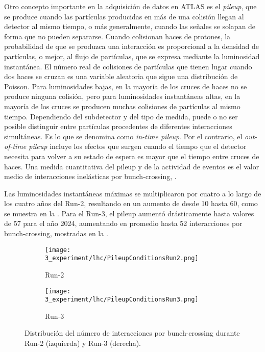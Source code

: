 Otro concepto importante en la adquisición de datos en \ac{ATLAS} es el \textit{pileup}, que se produce cuando las partículas producidas en más de una colisión \pp llegan al detector al mismo tiempo, o más generalmente, cuando las señales se solapan de forma que no pueden separarse. Cuando colisionan haces de protones, la probabilidad de que se produzca una interacción es proporcional a la densidad de partículas, o mejor, al flujo de partículas, que se expresa mediante la luminosidad instantánea. El número real de colisiones de partículas que tienen lugar cuando dos haces se cruzan es una variable aleatoria que sigue una distribución de Poisson. Para luminosidades bajas, en la mayoría de los cruces de haces no se produce ninguna colisión, pero para luminosidades instantáneas altas, en la mayoría de los cruces se producen muchas colisiones de partículas al mismo tiempo. Dependiendo del subdetector y del tipo de medida, puede o no ser posible distinguir entre partículas procedentes de diferentes interacciones simultáneas. Es lo que se denomina como \textit{in-time pileup}. Por el contrario, el \textit{out-of-time pileup} incluye los efectos que surgen cuando el tiempo que el detector necesita para volver a su estado de espera es mayor que el tiempo entre cruces de haces. Una medida cuantitativa del pileup y de la actividad de eventos es el valor medio de interacciones inelásticas \pp por bunch-crossing, \avgmu.

Las luminosidades instantáneas máximas se multiplicaron por cuatro a lo largo de los cuatro años del Run-2, resultando en un aumento de \avgmu desde 10 hasta 60, como se muestra en la \Fig{\ref{fig:atlas:runs:pileup_run2}}. Para el Run-3, el pileup aumentó drásticamente hasta valores de 57 para el año 2024, aumentando en promedio hasta 52 interacciones por bunch-crossing, mostradas en la \Fig{\ref{fig:atlas:runs:pileup_run3}}.

\begin{figure}[ht!]
    \centering
    \begin{subfigure}[h]{0.46\linewidth}
        \centering
        \texttt{[image: 3\_experiment/lhc/PileupConditionsRun2.png]}
        \caption{Run-2}
        \label{fig:atlas:runs:pileup_run2}
    \end{subfigure}
    \hfill
    \begin{subfigure}[h]{0.46\linewidth}
        \centering
        \texttt{[image: 3\_experiment/lhc/PileupConditionsRun3.png]}
        \caption{Run-3}
        \label{fig:atlas:runs:pileup_run3}
    \end{subfigure}
    \caption{Distribuci\'on del n\'umero de interacciones por bunch-crossing durante Run-2 (izquierda) y Run-3 (derecha).}
    \label{fig:atlas:runs:pileup}
\end{figure}